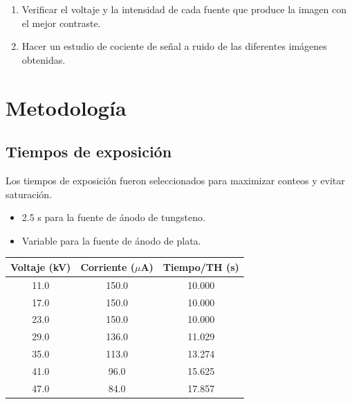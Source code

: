 \documentclass{sciposter}
\begin{document}
\begin{multicols}{3}
\begin{enumerate}
		\item Verificar el voltaje y la intensidad de cada fuente que produce la imagen con el mejor contraste.
		
		\item Hacer un estudio de cociente de señal a ruido de las diferentes imágenes obtenidas.
	\end{enumerate}

\section{Metodología}	
	\subsection{Tiempos de exposición}
	Los tiempos de exposición fueron seleccionados para maximizar conteos y evitar saturación.
	\begin{itemize}
		\item 2.5 s para la fuente de ánodo de tungsteno.
		\item Variable para la fuente de ánodo de plata. 
	\end{itemize}
	
	\begin{table}[h]
		\centering
		\small
		\begin{tabular}{| c | c c |}
			\hline
			\textbf{Voltaje (kV)} & \textbf{Corriente ($\mu$A)} & \textbf{Tiempo/TH (s)} \\
			\hline
			11.0 & 150.0 & 10.000 \\
			17.0 & 150.0 & 10.000 \\
			23.0 & 150.0 & 10.000 \\
			29.0 & 136.0 & 11.029 \\
			35.0 & 113.0 & 13.274 \\
			41.0 & 96.0 & 15.625 \\
			47.0 & 84.0 & 17.857 \\
			\hline
		\end{tabular}
		\label{tab:corrientes}
	\end{table}
	

\end{multicols}
\end{document}
